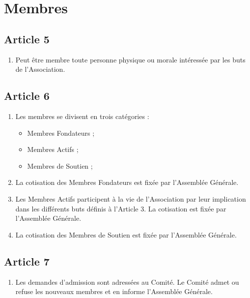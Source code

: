 \documentclass[12pt,twoside]{report}
\begin{document}
\section*{Membres}

\subsection*{Article 5}
\begin{enumerate}
\item Peut être membre toute personne physique ou morale intéressée par les buts de l’Association.
\end{enumerate}

\subsection*{Article 6}
\begin{enumerate}
\item Les membres se divisent en trois catégories :
\begin{itemize}
\item Membres Fondateurs ;
\item Membres Actifs ;
\item Membres de Soutien ;
\end{itemize}

\item La cotisation des Membres Fondateurs est fixée par l’Assemblée Générale.

\item Les Membres Actifs participent à la vie de l’Association par leur implication dans les différents buts définis à l’Article 3. La cotisation est fixée par l’Assemblée Générale.

\item La cotisation des Membres de Soutien est fixée par l’Assemblée Générale.
\end{enumerate}


\subsection*{Article 7}
\begin{enumerate}
\item Les demandes d’admission sont adressées au Comité. Le Comité admet ou refuse les nouveaux membres et en informe l’Assemblée Générale.
\end{enumerate}
\end{document}
